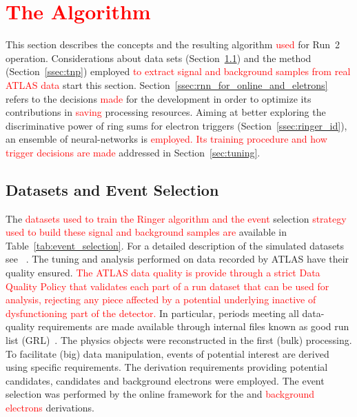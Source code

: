 \chapter{\textcolor{red}{The \rnn{} Algorithm}}%
\label{sec:neuralringer}

This section describes the \rnn{} concepts and the resulting algorithm \textcolor{red}{used} for Run~2
operation. Considerations about data sets (Section~\ref{ssec:dataset}) and the \TnP method
(Section~\ref{ssec:tnp}) employed \textcolor{red}{to extract signal and background samples
from real ATLAS data} start this section. Section~\ref{ssec:rnn_for_online_and_eletrons} refers to the
decisions \textcolor{red}{made} for the \rnn{} development in order to optimize its contributions in \textcolor{red}{saving} processing resources. Aiming at better exploring the discriminative
power of ring sums for electron triggers (Section~\ref{ssec:ringer_id}),
an ensemble of neural-networks is \textcolor{red}{employed. Its training procedure and how trigger decisions are made} addressed in Section~\ref{sec:tuning}.




\section{Datasets and Event Selection}%
\label{ssec:dataset}

The \textcolor{red}{datasets used to train the Ringer algorithm and the event} selection \textcolor{red}{strategy used to build these signal and background samples are} available in
Table~\ref{tab:event_selection}. For a detailed description of the simulated
datasets see ~\cite[Section 3]{ATLAS-PERF-2017-01-002}. The tuning and analysis
performed on data recorded by ATLAS have their quality ensured. \textcolor{red}{The ATLAS data quality is provide through a strict Data Quality Policy that validates each part of a run dataset that can be used for analysis, rejecting any piece affected by a potential underlying inactive of dysfunctioning part of the detector.} 
In particular, periods meeting all data-quality requirements
are made available through internal files known as good run list
(GRL)~\cite{grl_site}. The physics objects were reconstructed in the first
(bulk) processing. To facilitate (big) data manipulation, events of potential
interest are derived using specific requirements. The derivation requirements
providing potential \Zee{} \tnp{} candidates, %
\Jee{} \tnp{} candidates
 and background electrons %
  were employed. The event selection was
performed by the online framework for the \textcolor{red}{\Zee{} \tnp{}} and \textcolor{red}{background electrons} derivations.%

